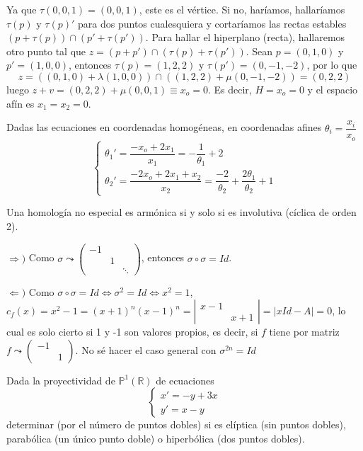 \begin{sol}
    Ya que $\tau(0,0,1)=(0,0,1)$, este es el v\'ertice. Si no, har\'iamos, hallar\'iamos $\tau(p)$ y $\tau(p)'$ para dos puntos cualesquiera y cortar\'iamos las rectas estables $(p+\tau(p))\cap (p'+\tau(p'))$. Para hallar el hiperplano (recta), hallaremos otro punto tal que $z=(p+p')\cap(\tau(p)+\tau(p'))$. Sean $p=(0,1,0)$ y $p'=(1,0,0)$, entonces $\tau(p)=(1,2,2)$ y $\tau(p')=(0,-1,-2)$, por lo que 
    $$z=((0,1,0) + \lambda (1,0,0)) \cap ((1,2,2) + \mu(0,-1,-2)) = (0,2,2)$$
    luego $z+v = (0,2,2)+\mu(0,0,1) \equiv x_o=0$. Es decir, $H=x_o=0$ y el espacio af\'in es $x_1=x_2=0$. 

    Dadas las ecuaciones en coordenadas homog\'eneas, en coordenadas afines $\theta_i=\dfrac{x_i}{x_o}$
    $$\begin{cases}
        \theta_1'=\dfrac{-x_o+2x_1}{x_1} = -\dfrac{1}{\theta_1}+2 \\  \theta_2'=\dfrac{-2x_o+2x_1+x_2}{x_2}=\dfrac{-2}{\theta_2} + \dfrac{2\theta_1}{\theta_2}+1
    \end{cases}$$

    Una homología no especial es armónica si y solo si es involutiva (c\'iclica de orden 2).
    \begin{dem}
        $\Rightarrow)$ Como $\sigma \leadsto \left( \begin{smallmatrix}
            -1 \\ & 1 \\ & & \ddots 
        \end{smallmatrix}\right)$, entonces $\sigma\circ \sigma = Id$. 

        $\Leftarrow)$ Como $\sigma \circ \sigma = Id \iff \sigma^{2} = Id \iff x^{2}=1$, $c_f(x) = x^{2}-1= (x+1)^n(x-1)^n = \left|\begin{smallmatrix}
            x-1 \\ & x+1
         \end{smallmatrix}\right|=|xId-A| = 0$, lo cual es solo cierto si 1 y -1 son valores propios, es decir, si $f$ tiene por matriz $f \leadsto \left( \begin{smallmatrix}
            -1 \\ & 1 
        \end{smallmatrix}\right)$. No s\'e hacer el caso general con $\sigma^{2n} = Id$
    \end{dem}
\end{sol}
\begin{ejer}
    [9] Dada la proyectividad de $\mathbb P^1(\mathbb R)$ de ecuaciones
    $$\begin{cases}
        x'=-y+3x \\ y'=x-y
    \end{cases}$$
    determinar (por el n\'umero de puntos dobles) si es el\'iptica (sin puntos dobles), parab\'olica (un \'unico punto doble) o hiperb\'olica (dos puntos dobles).
\end{ejer}  
